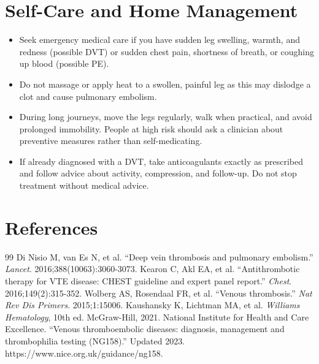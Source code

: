 \section*{Self-Care and Home Management}
\begin{itemize}
 \item Seek emergency medical care if you have sudden leg swelling, warmth, and redness (possible DVT) or sudden chest pain, shortness of breath, or coughing up blood (possible PE).
 \item Do not massage or apply heat to a swollen, painful leg as this may dislodge a clot and cause pulmonary embolism.
 \item During long journeys, move the legs regularly, walk when practical, and avoid prolonged immobility. People at high risk should ask a clinician about preventive measures rather than self-medicating.
 \item If already diagnosed with a DVT, take anticoagulants exactly as prescribed and follow advice about activity, compression, and follow-up. Do not stop treatment without medical advice.
\end{itemize}

\section*{References}
\begin{thebibliography}{99}
 Di Nisio M, van Es N, et al. ``Deep vein thrombosis and pulmonary embolism.'' \textit{Lancet}. 2016;388(10063):3060-3073.
 Kearon C, Akl EA, et al. ``Antithrombotic therapy for VTE disease: CHEST guideline and expert panel report.'' \textit{Chest}. 2016;149(2):315-352.
 Wolberg AS, Rosendaal FR, et al. ``Venous thrombosis.'' \textit{Nat Rev Dis Primers}. 2015;1:15006.
 Kaushansky K, Lichtman MA, et al. \textit{Williams Hematology}, 10th ed. McGraw-Hill, 2021.
 National Institute for Health and Care Excellence. ``Venous thromboembolic diseases: diagnosis, management and thrombophilia testing (NG158).'' Updated 2023. https://www.nice.org.uk/guidance/ng158.
\end{thebibliography}
